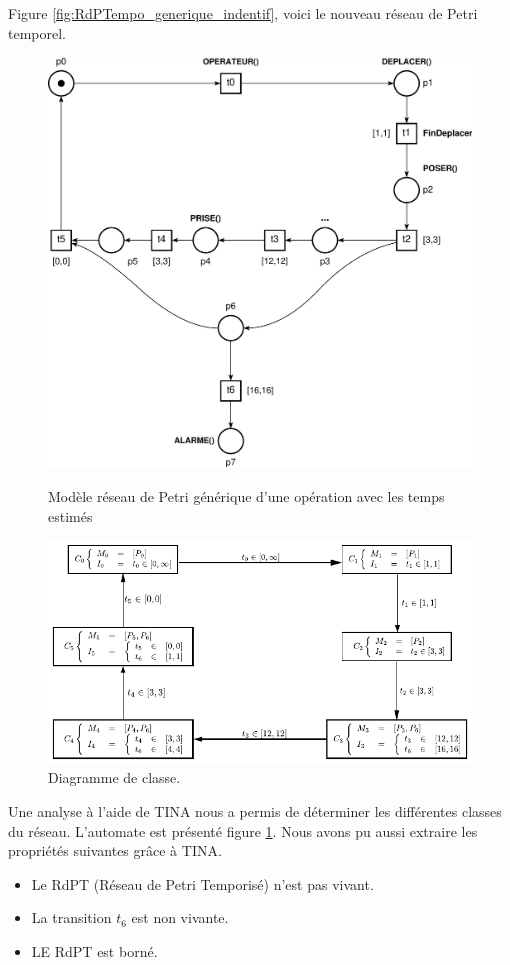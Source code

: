 Figure \ref{fig:RdPTempo_generique_indentif}, voici le nouveau réseau de Petri temporel.
\begin{figure}[!ht]
\begin{minipage}[t]{.4\textwidth}
\centering
\includegraphics[width=.8\textwidth]{./I/images/III-1_v3_esti.pdf}
\caption{\label{fig:RdPTempo_generique_indentif}Modèle réseau de Petri générique d'une opération avec les temps estimés}
\end{minipage}\hfill%
\begin{minipage}[t]{.58\textwidth}
\centering
\includegraphics[width=.9\textwidth]{./I/images/III-1_v3_aut.pdf}
\caption{\label{fig:III-1-automate}Diagramme de classe.}
\end{minipage}
\end{figure}
Une analyse à l'aide de TINA nous a permis de déterminer les différentes classes du réseau. L'automate est présenté figure \ref{fig:III-1-automate}. Nous avons pu aussi extraire les propriétés suivantes grâce à TINA.

\begin{itemize}
\item Le RdPT (Réseau de Petri Temporisé) n'est pas vivant. 
\item La transition $t_6$ est non vivante. 
\item LE RdPT est borné.
\end{itemize}

